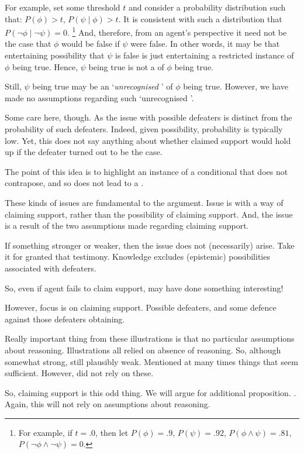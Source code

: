 \begin{note}
  For example, set some threshold \(t\) and consider a probability distribution such that:
  \(P(\phi) > t\), \(P(\psi \mid \phi) > t\).
  It is consistent with such a distribution that \(P(\lnot\phi \mid \lnot\psi) = 0\).\nolinebreak
  \footnote{
    For example, if \(t = .0\), then let \(P(\phi) = .9\), \(P(\psi) = .92\), \(P(\phi \land \psi) = .81\), \(P(\lnot\phi \land \lnot\psi) = 0\).
  }
  And, therefore, from an agent's perspective it need not be the case that \(\phi\) would be false if \(\psi\) were false.
  In other words, it may be that entertaining possibility that \(\psi\) is false is just entertaining a restricted instance of \(\phi\) being true.
  Hence, \(\psi\) being true is not a \requ{} of \(\phi\) being true.

  Still,  \(\psi\) being true may be an `\emph{unrecognised} \requ{}' of \(\phi\) being true.
  However, we have made no assumptions regarding such `unrecognised '.

  {
    \color{red}
    Some care here, though.
    As the issue with possible defeaters is distinct from the probability of such defeaters.
    Indeed, given possibility, probability is typically low.
    Yet, this does not say anything about whether claimed support would hold up if the defeater turned out to be the case.

    The point of this {\color{red} idea} is to highlight an instance of a conditional that does not contrapose, and so does not lead to a \requ{}.
  }
\end{note}

\begin{note}
  These kinds of issues are fundamental to the argument.
  Issue is with a way of claiming support, rather than the possibility of claiming support.
  And, the issue is a result of the two assumptions made regarding claiming support.

  If something stronger or weaker, then the issue does not (necessarily) arise.
  Take it for granted that testimony.
  Knowledge excludes (epistemic) possibilities associated with defeaters.

  So, even if agent fails to claim support, may have done something interesting!

  However, focus is on claiming support.
  Possible defeaters, and some defence against those defeaters obtaining.

  Really important thing from these illustrations is that no particular assumptions about reasoning.
  Illustrations all relied on absence of reasoning.
  So, although somewhat strong, still plausibly weak.
  Mentioned at many times things that seem sufficient.
  However, did not rely on these.

  So, claiming support is this odd thing.
  We will argue for additional proposition.
  \nI{}.
  Again, this will not rely on assumptions about reasoning.
\end{note}

